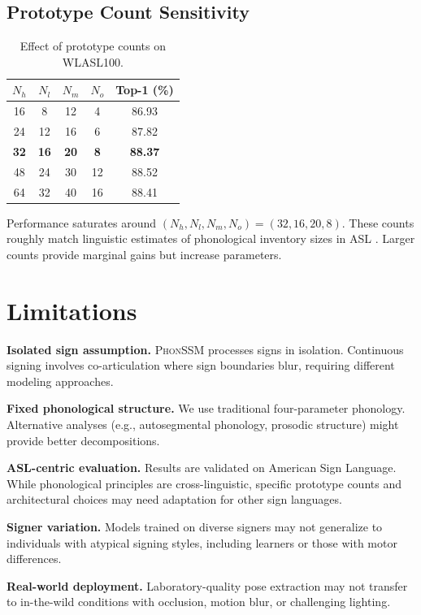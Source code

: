\documentclass{article}
\theoremstyle{definition}
\theoremstyle{remark}
\newcommand{\phonssm}{\textsc{PhonSSM}}
\begin{document}
\subsection{Prototype Count Sensitivity}

\begin{table}[ht]
\caption{Effect of prototype counts on WLASL100.}
\label{tab:proto_sensitivity}
\vspace{-1mm}
\begin{center}
\begin{small}
\begin{tabular*}{\columnwidth}{@{\extracolsep{\fill}}ccccc@{}}
\toprule
$N_h$ & $N_l$ & $N_m$ & $N_o$ & Top-1 (\%) \\
\midrule
16 & 8 & 12 & 4 & 86.93 \\
24 & 12 & 16 & 6 & 87.82 \\
\textbf{32} & \textbf{16} & \textbf{20} & \textbf{8} & \textbf{88.37} \\
48 & 24 & 30 & 12 & 88.52 \\
64 & 32 & 40 & 16 & 88.41 \\
\bottomrule
\end{tabular*}
\end{small}
\end{center}
\vspace{-2mm}
\end{table}

Performance saturates around $(N_h, N_l, N_m, N_o) = (32, 16, 20, 8)$. These counts roughly match linguistic estimates of phonological inventory sizes in ASL \citep{battison1978lexical}. Larger counts provide marginal gains but increase parameters.

\section{Limitations}
\label{app:limitations}

\textbf{Isolated sign assumption.} \phonssm{} processes signs in isolation. Continuous signing involves co-articulation where sign boundaries blur, requiring different modeling approaches.

\textbf{Fixed phonological structure.} We use traditional four-parameter phonology. Alternative analyses (e.g., autosegmental phonology, prosodic structure) might provide better decompositions.

\textbf{ASL-centric evaluation.} Results are validated on American Sign Language. While phonological principles are cross-linguistic, specific prototype counts and architectural choices may need adaptation for other sign languages.

\textbf{Signer variation.} Models trained on diverse signers may not generalize to individuals with atypical signing styles, including learners or those with motor differences.

\textbf{Real-world deployment.} Laboratory-quality pose extraction may not transfer to in-the-wild conditions with occlusion, motion blur, or challenging lighting.
\end{document}
